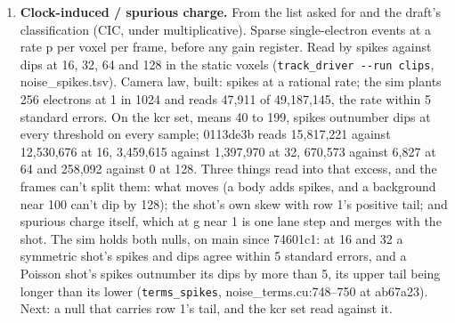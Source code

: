 \begin{enumerate}
A voxel and its x neighbor share the scale. The neighbor route loses it and the raw route carries it (row 26). Camera law, built: a plane offset per frame; the sim plants variance 4 and reads 36‰ against 38 within 6. A shared scale with memory is built (ddeccb3): the camera law gains a scale path in octaves (\texttt{scale\_\allowbreak{}square}, \texttt{scale\_\allowbreak{}octaves}, \texttt{scale\_\allowbreak{}bits}), about 1 ± 6\% at 4 octaves and 10 bits in \texttt{noise\_\allowbreak{}terms}, and \texttt{noise\_\allowbreak{}structure\_\allowbreak{}volume} fits (d\_\allowbreak{}k − d\_\allowbreak{}\{k,x\})² against q = (Σ\_\allowbreak{}t I − Σ\_\allowbreak{}t I\_\allowbreak{}x)² and the pair total. D\_\allowbreak{}a at lags 1, 2, 4, 8, 16, 32 and 64 reads 3731, 5783, 7744, 11596, 11592, 11750 and 8758 millionths, against the camera's own path 3692, 5737, 7653, 11471, 11442, 11726 and 8690, within 500. As a box's root (E16), the planes term is shared along y and x, one value for each frame and z, and the shared scale's value in each plane of a frame is inside that pattern; planted alone as a plane offset it saves 7‰ at variance 64, 28‰ at 256 and 59‰ at 1,024. What makes it (the light, the focus or the acquisition) isn't in the frames; it sits in Ω until its source is named. Next: the fit on the kcr set.
\item \textbf{Clock-induced / spurious charge.} From the list asked for and the draft's classification (CIC, under multiplicative). Sparse single-electron events at a rate p per voxel per frame, before any gain register. Read by spikes against dips at 16, 32, 64 and 128 in the static voxels (\texttt{track\_\allowbreak{}driver -\allowbreak{}-\allowbreak{}run clips}, noise\_\allowbreak{}spikes.tsv). Camera law, built: spikes at a rational rate; the sim plants 256 electrons at 1 in 1024 and reads 47,911 of 49,187,145, the rate within 5 standard errors. On the kcr set, means 40 to 199, spikes outnumber dips at every threshold on every sample; 0113de3b reads 15,817,221 against 12,530,676 at 16, 3,459,615 against 1,397,970 at 32, 670,573 against 6,827 at 64 and 258,092 against 0 at 128. Three things read into that excess, and the frames can't split them: what moves (a body adds spikes, and a background near 100 can't dip by 128); the shot's own skew with row 1's positive tail; and spurious charge itself, which at g near 1 is one lane step and merges with the shot. The sim holds both nulls, on main since 74601c1: at 16 and 32 a symmetric shot's spikes and dips agree within 5 standard errors, and a Poisson shot's spikes outnumber its dips by more than 5, its upper tail being longer than its lower (\texttt{terms\_\allowbreak{}spikes}, noise\_\allowbreak{}terms.cu:748–750 at ab67a23). Next: a null that carries row 1's tail, and the kcr set read against it.

\end{enumerate}
